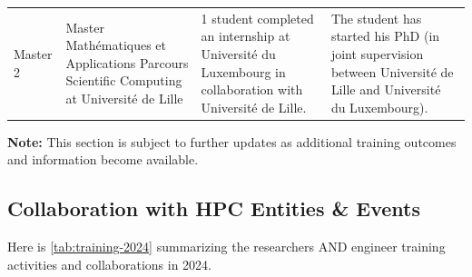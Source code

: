 \begin{landscape}
\begin{xltabular}{\linewidth}{X X X X }
      Master 2  
        & Master Mathématiques et Applications Parcours Scientific Computing at Université de Lille 
        & 1 student completed an internship at Université du Luxembourg in collaboration with Université de Lille.
        & The student has started his PhD (in joint supervision between Université de Lille and Université du Luxembourg). \\[0.75em]
      
      \end{xltabular}
      \end{landscape}



    \vspace{1em}
    \noindent \textbf{Note:} This section is subject to further updates as additional training outcomes and information become available.


  \subsection{Collaboration with HPC Entities \& Events}
  \label{sec:training-hpc}

Here is \cref{tab:training-2024} summarizing the researchers AND engineer training activities and collaborations in 2024.

